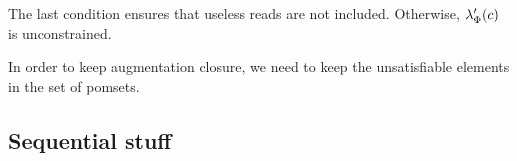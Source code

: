 \begin{definition}
\begin{itemize}
\end{itemize}
\end{definition}
The last condition ensures that useless reads are not included.
Otherwise, $\lambda_{\Phi}'(c)$ is unconstrained.

In order to keep augmentation closure, we need to keep the unsatisfiable
elements in the set of pomsets.


\begin{comment}
The first constraint ensures that events are ordered before a release and
after an acquire.  The second constraint ensures that thread-local reads do
not cross acquire fences.
 
The second constraint prevents bad executions like the following:
   x=1; rel; acq; if (x) {y=1};  ||  acq; x=0; rel; 
where the second thread is interleaved between the rel and acq of the first.

Note that you cannot require that $\bForm'$ is independent of every $\bLoc$
because then it's not augment closed.
\end{comment}

\subsection{Sequential stuff}

